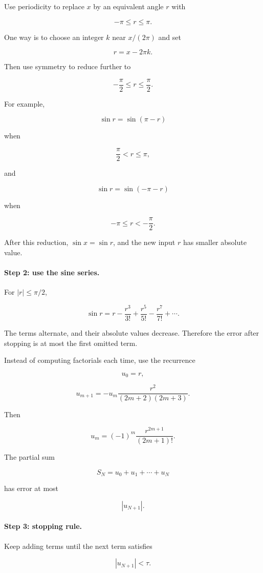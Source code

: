 Use periodicity to replace \(x\) by an equivalent angle \(r\) with

\[
-\pi\le r\le \pi.
\]

One way is to choose an integer \(k\) near \(x/(2\pi)\) and set

\[
r=x-2\pi k.
\]

Then use symmetry to reduce further to

\[
-\frac{\pi}{2}\le r\le \frac{\pi}{2}.
\]

For example,

\[
\sin r=\sin(\pi-r)
\]

when

\[
\frac{\pi}{2}<r\le \pi,
\]

and

\[
\sin r=\sin(-\pi-r)
\]

when

\[
-\pi\le r<-\frac{\pi}{2}.
\]

After this reduction, \(\sin x=\sin r\), and the new input \(r\) has smaller absolute value.

\paragraph{Step 2: use the sine series.}
For \(|r|\le \pi/2\),

\[
\sin r
=
r-\frac{r^3}{3!}+\frac{r^5}{5!}-\frac{r^7}{7!}+\cdots.
\]

The terms alternate, and their absolute values decrease.  Therefore the error after
stopping is at most the first omitted term.

Instead of computing factorials each time, use the recurrence

\[
u_0=r,
\]

\[
u_{m+1}
=
-u_m\frac{r^2}{(2m+2)(2m+3)}.
\]

Then

\[
u_m=(-1)^m\frac{r^{2m+1}}{(2m+1)!}.
\]

The partial sum

\[
S_N=u_0+u_1+\cdots+u_N
\]

has error at most

\[
|u_{N+1}|.
\]

\paragraph{Step 3: stopping rule.}
Keep adding terms until the next term satisfies

\[
|u_{N+1}|<\tau.
\]

